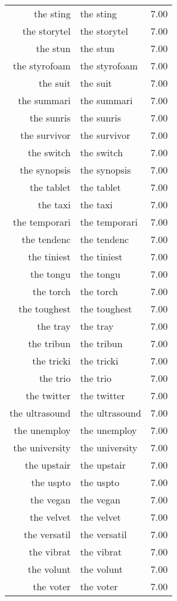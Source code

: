 \begin{table}[ht]
\begin{tabular}{rlr}
  the sting & the sting & 7.00 \\ 
  the storytel & the storytel & 7.00 \\ 
  the stun & the stun & 7.00 \\ 
  the styrofoam & the styrofoam & 7.00 \\ 
  the suit & the suit & 7.00 \\ 
  the summari & the summari & 7.00 \\ 
  the sunris & the sunris & 7.00 \\ 
  the survivor & the survivor & 7.00 \\ 
  the switch & the switch & 7.00 \\ 
  the synopsis & the synopsis & 7.00 \\ 
  the tablet & the tablet & 7.00 \\ 
  the taxi & the taxi & 7.00 \\ 
  the temporari & the temporari & 7.00 \\ 
  the tendenc & the tendenc & 7.00 \\ 
  the tiniest & the tiniest & 7.00 \\ 
  the tongu & the tongu & 7.00 \\ 
  the torch & the torch & 7.00 \\ 
  the toughest & the toughest & 7.00 \\ 
  the tray & the tray & 7.00 \\ 
  the tribun & the tribun & 7.00 \\ 
  the tricki & the tricki & 7.00 \\ 
  the trio & the trio & 7.00 \\ 
  the twitter & the twitter & 7.00 \\ 
  the ultrasound & the ultrasound & 7.00 \\ 
  the unemploy & the unemploy & 7.00 \\ 
  the university & the university & 7.00 \\ 
  the upstair & the upstair & 7.00 \\ 
  the uspto & the uspto & 7.00 \\ 
  the vegan & the vegan & 7.00 \\ 
  the velvet & the velvet & 7.00 \\ 
  the versatil & the versatil & 7.00 \\ 
  the vibrat & the vibrat & 7.00 \\ 
  the volunt & the volunt & 7.00 \\ 
  the voter & the voter & 7.00 \\ 

\end{tabular}
\end{table}
